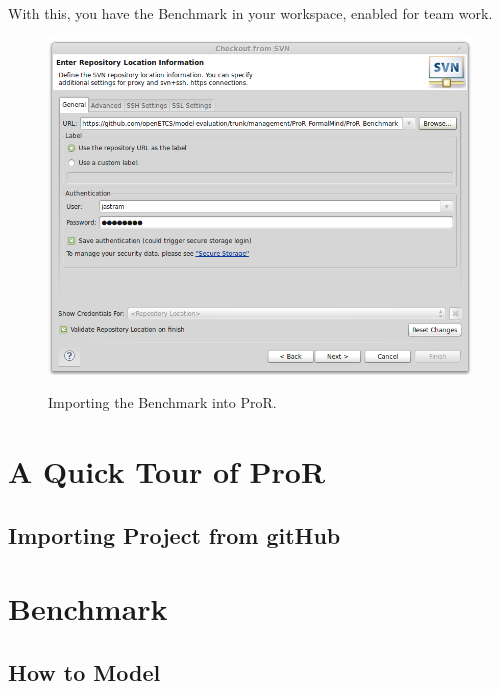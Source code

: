 \documentclass{template/openetcs_report}
\begin{document}
With this, you have the Benchmark in your workspace, enabled for team work.

\begin{figure}[h!]
	\begin{center}
	\includegraphics[width=.8\textwidth]{img/svn-config.png}
	\label{fig:svn-config}
	\end{center}
	\caption{Importing the Benchmark into ProR.}
\end{figure}



\chapter{A Quick Tour of ProR}
\label{sec:pror_tour}


\section{Importing Project from gitHub}


\chapter{Benchmark}

\section{How to Model}
\end{document}
